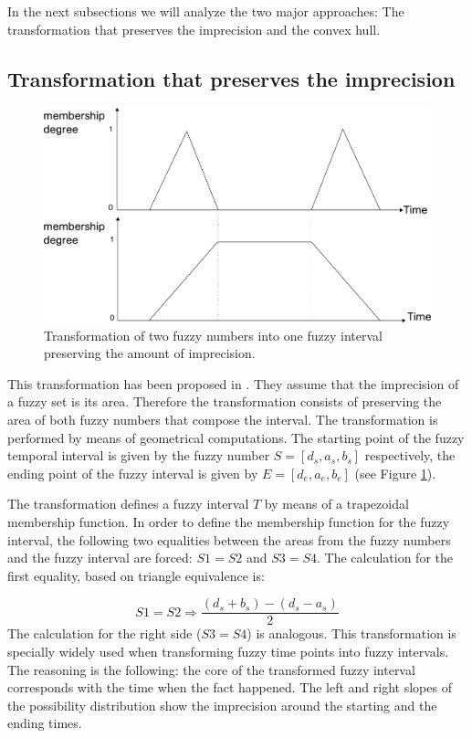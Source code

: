 \documentclass[twoside,twocolumn,a4paper]{article}
\begin{document}
In the next subsections we will analyze the two major approaches: The transformation that preserves the imprecision and the convex hull. 




\subsection{\label{subsubsec:transf-pres-imp}Transformation that preserves the imprecision}
\begin{figure}[h!]
  \centering
  \includegraphics[scale=0.2]{graphs/preservingImprecision.pdf}
  \caption{Transformation of two fuzzy numbers into one fuzzy interval preserving the amount of imprecision.}
  \label{fig:transf-pres-imp}
\end{figure}
This transformation has been proposed in \cite{Garrido2009}. They assume that the imprecision of a fuzzy set is its area. Therefore the transformation consists of preserving the area of both fuzzy numbers that compose the interval. The transformation is performed by means of geometrical computations. The starting point of the fuzzy temporal interval is given by the fuzzy number $S = [d_s,a_s,b_s]$ respectively, the ending point of the fuzzy interval is given by $E = [d_e,a_e,b_e]$ (see Figure \ref{fig:transf-pres-imp}).

The transformation defines a fuzzy interval $T$ by means of a trapezoidal membership function. In order to define the membership function for the fuzzy interval, the following two equalities between the areas from the fuzzy numbers and the fuzzy interval are forced: $S1=S2$ and $S3=S4$. The calculation for the first equality, based on triangle equivalence is:

\begin{equation}
\label{eq:preserving-imprecision}
S1=S2 \Rightarrow \frac{\left(d_s+b_s\right)-\left(d_s-a_s\right)}{2}
\end{equation}        			
The calculation for the right side ($S3=S4$) is analogous.
This transformation is specially widely used when transforming fuzzy time points into fuzzy intervals. The reasoning is the following: the core of the transformed fuzzy interval corresponds with the time when the fact happened. The left and right slopes of the possibility distribution show the imprecision around the starting and the ending times. 
\end{document}
